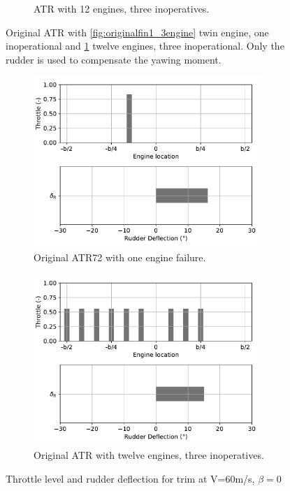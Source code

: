\begin{figure}[hbt!]
\begin{subfigure}{0.49\textwidth}
		\caption{ATR with 12 engines, three inoperatives.}
		\label{fig:originalfin1_15engine}
	\end{subfigure}
	\caption{Original ATR with \ref{fig:originalfin1_3engine} twin engine, one inoperational and \ref{fig:originalfin1_15engine} twelve engines, three inoperational. Only the rudder is used to compensate the yawing moment.} \label{MapOrignialTwin+DEP}
\end{figure}

\begin{figure}
	\begin{subfigure}{0.49\textwidth}
		\includegraphics[width=0.95\textwidth]{Defloriginalfin1Eng3RudFalse}
		\caption{Original ATR72 with one engine failure.}
		\label{fig:Defloriginalfin1_3engine}
	\end{subfigure}
	\begin{subfigure}{0.49\textwidth}
		\includegraphics[width=0.95\textwidth]{Defloriginalfin1Eng15RudFalse}
		\caption{Original ATR with twelve engines, three inoperatives.}
		\label{fig:Defloriginalfin1_15engine}
	\end{subfigure}
	\caption{Throttle level and rudder deflection for trim at V=60m/s, $\beta=0$} \label{DeflOrignialeNoDiffThrust}
\end{figure}

